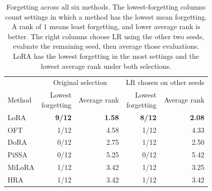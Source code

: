 \begin{table}[!htbp]
\caption{Forgetting across all six methods. The lowest-forgetting columns count settings in which a method has the lowest mean forgetting. A rank of 1 means least forgetting, and lower average rank is better. The right columns choose LR using the other two seeds, evaluate the remaining seed, then average those evaluations. LoRA has the lowest forgetting in the most settings and the lowest average rank under both selections.}
\label{tab:retention-all-methods}
\begin{center}
\begin{tabular*}{\linewidth}{@{\extracolsep{\fill}}lrrrr@{}}\toprule
& \multicolumn{2}{c}{Original selection} & \multicolumn{2}{c}{LR chosen on other seeds}\\Method & \shortstack{Lowest\\forgetting} & Average rank & \shortstack{Lowest\\forgetting} & Average rank\\\midrule
\textcolor{LoRAColor}{LoRA} & \textbf{9/12} & \textbf{1.58} & \textbf{8/12} & \textbf{2.08} \\
\textcolor{OFTColor}{OFT} & 1/12 & 4.58 & 1/12 & 4.33 \\
\textcolor{DoRAColor}{DoRA} & 0/12 & 2.75 & 1/12 & 2.50 \\
\textcolor{PiSSAColor}{PiSSA} & 0/12 & 5.25 & 0/12 & 5.42 \\
\textcolor{MiLoRAColor}{MiLoRA} & 1/12 & 3.42 & 1/12 & 3.25 \\
\textcolor{HRAColor}{HRA} & 1/12 & 3.42 & 1/12 & 3.42 \\
\bottomrule\end{tabular*}
\end{center}
\end{table}
